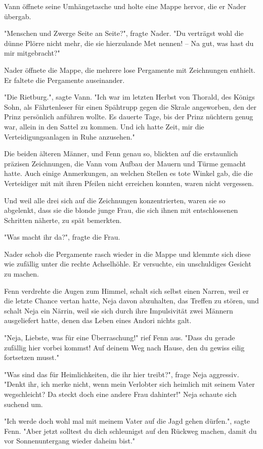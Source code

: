 \documentclass[10pt, a4paper, oneside]{book}
\begin{document}
\begin{multicols}{2}
Vann öffnete seine Umhängetasche und holte eine Mappe hervor, die er Nader übergab.

"Menschen und Zwerge Seite an Seite?", fragte Nader. "Du verträgst wohl die dünne Plörre nicht mehr, die sie hierzulande Met nennen! – Na gut, was hast du mir mitgebracht?"

Nader öffnete die Mappe, die mehrere lose Pergamente mit Zeichnungen enthielt. Er faltete die Pergamente auseinander.

"Die Rietburg.", sagte Vann. "Ich war im letzten Herbst von Thorald, des Königs Sohn, als Fährtenleser für einen Spähtrupp gegen die Skrale angeworben, den der Prinz persönlich anführen wollte. Es dauerte Tage, bis der Prinz nüchtern genug war, allein in den Sattel zu kommen. Und ich hatte Zeit, mir die Verteidigungsanlagen in Ruhe anzusehen."

Die beiden älteren Männer, und Fenn genau so, blickten auf die erstaunlich präzisen Zeichnungen, die Vann vom Aufbau der Mauern und Türme gemacht hatte. Auch einige Anmerkungen, an welchen Stellen es tote Winkel gab, die die Verteidiger mit mit ihren Pfeilen nicht erreichen konnten, waren nicht vergessen.

Und weil alle drei sich auf die Zeichnungen konzentrierten, waren sie so abgelenkt, dass sie die blonde junge Frau, die sich ihnen mit entschlossenen Schritten näherte, zu spät bemerkten.

"Was macht ihr da?", fragte die Frau.

Nader schob die Pergamente rasch wieder in die Mappe und klemmte sich diese wie zufällig unter die rechte Achselhöhle. Er versuchte, ein unschuldiges Gesicht zu machen.

Fenn verdrehte die Augen zum Himmel, schalt sich selbst einen Narren, weil er die letzte Chance vertan hatte, Neja davon abzuhalten, das Treffen zu stören, und schalt Neja ein Närrin, weil sie sich durch ihre Impulsivität zwei Männern ausgeliefert hatte, denen das Leben eines Andori nichts galt.

"Neja, Liebste, was für eine Überraschung!" rief Fenn aus. "Dass du gerade zufällig hier vorbei kommst! Auf deinem Weg nach Hause, den du gewiss eilig fortsetzen musst."

"Was sind das für Heimlichkeiten, die ihr hier treibt?", frage Neja aggressiv. "Denkt ihr, ich merke nicht, wenn mein Verlobter sich heimlich mit seinem Vater wegschleicht? Da steckt doch eine andere Frau dahinter!" Neja schaute sich suchend um.

"Ich werde doch wohl mal mit meinem Vater auf die Jagd gehen dürfen.", sagte Fenn. "Aber jetzt solltest du dich schleunigst auf den Rückweg machen, damit du vor Sonnenuntergang wieder daheim bist."


\end{multicols}
\end{document}
